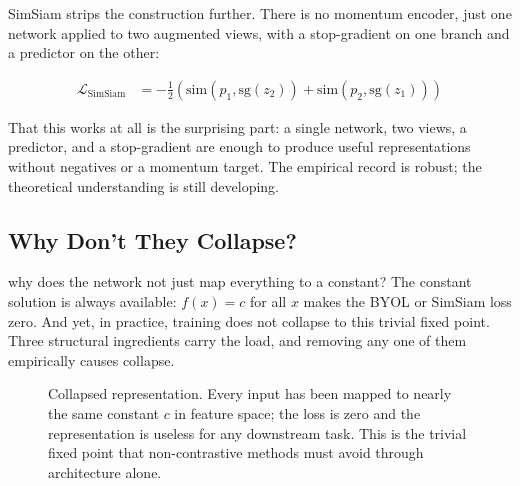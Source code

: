 \vspace{1.5em}

\cite{Chen2021SimSiam}
SimSiam strips the construction further.
There is no momentum encoder, just one network applied to two augmented views, with a stop-gradient on one branch and a predictor on the other:

\begin{align}
    \mathcal{L}_{\text{SimSiam}} &= -\tfrac{1}{2}\!\left(\mathrm{sim}(p_1, \mathrm{sg}(z_2)) + \mathrm{sim}(p_2, \mathrm{sg}(z_1))\right)
    \label{eq:simsiam}
\end{align}

That this works at all is the surprising part: a single network, two views, a predictor, and a stop-gradient are enough to produce useful representations without negatives or a momentum target.
The empirical record is robust; the theoretical understanding is still developing.


\subsection{Why Don't They Collapse?}


 why does the network not just map everything to a constant?
The constant solution is always available: $f(x) = c$ for all $x$ makes the BYOL or SimSiam loss zero.
And yet, in practice, training does not collapse to this trivial fixed point.
Three structural ingredients carry the load, and removing any one of them empirically causes collapse.

\begin{figure}
\centering
{}
\caption{Collapsed representation. Every input has been mapped to nearly the same constant $c$ in feature space; the loss is zero and the representation is useless for any downstream task. This is the trivial fixed point that non-contrastive methods must avoid through architecture alone.}
\label{fig:collapsed_repr}
\end{figure}

